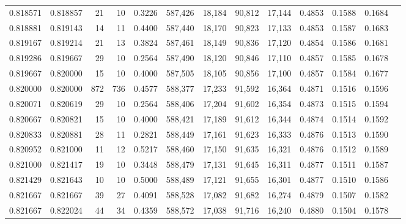 \begin{tabular}{rrrrrrrrrrrrr}
0.818571 & 0.818857 &    21 &  10 &                                     0.3226 & 587,426 &  18,184 &  90,812 &  17,144 & 0.4853 & 0.1588 & 0.1684 \\
0.818881 & 0.819143 &    14 &  11 &                                     0.4400 & 587,440 &  18,170 &  90,823 &  17,133 & 0.4853 & 0.1587 & 0.1683 \\
0.819167 & 0.819214 &    21 &  13 &                                     0.3824 & 587,461 &  18,149 &  90,836 &  17,120 & 0.4854 & 0.1586 & 0.1681 \\
0.819286 & 0.819667 &    29 &  10 &                                     0.2564 & 587,490 &  18,120 &  90,846 &  17,110 & 0.4857 & 0.1585 & 0.1678 \\
0.819667 & 0.820000 &    15 &  10 &                                     0.4000 & 587,505 &  18,105 &  90,856 &  17,100 & 0.4857 & 0.1584 & 0.1677 \\
0.820000 & 0.820000 &   872 & 736 &                                     0.4577 & 588,377 &  17,233 &  91,592 &  16,364 & 0.4871 & 0.1516 & 0.1596 \\
0.820071 & 0.820619 &    29 &  10 &                                     0.2564 & 588,406 &  17,204 &  91,602 &  16,354 & 0.4873 & 0.1515 & 0.1594 \\
0.820667 & 0.820821 &    15 &  10 &                                     0.4000 & 588,421 &  17,189 &  91,612 &  16,344 & 0.4874 & 0.1514 & 0.1592 \\
0.820833 & 0.820881 &    28 &  11 &                                     0.2821 & 588,449 &  17,161 &  91,623 &  16,333 & 0.4876 & 0.1513 & 0.1590 \\
0.820952 & 0.821000 &    11 &  12 &                                     0.5217 & 588,460 &  17,150 &  91,635 &  16,321 & 0.4876 & 0.1512 & 0.1589 \\
0.821000 & 0.821417 &    19 &  10 &                                     0.3448 & 588,479 &  17,131 &  91,645 &  16,311 & 0.4877 & 0.1511 & 0.1587 \\
0.821429 & 0.821643 &    10 &  10 &                                     0.5000 & 588,489 &  17,121 &  91,655 &  16,301 & 0.4877 & 0.1510 & 0.1586 \\
0.821667 & 0.821667 &    39 &  27 &                                     0.4091 & 588,528 &  17,082 &  91,682 &  16,274 & 0.4879 & 0.1507 & 0.1582 \\
0.821667 & 0.822024 &    44 &  34 &                                     0.4359 & 588,572 &  17,038 &  91,716 &  16,240 & 0.4880 & 0.1504 & 0.1578 \\

\end{tabular}
